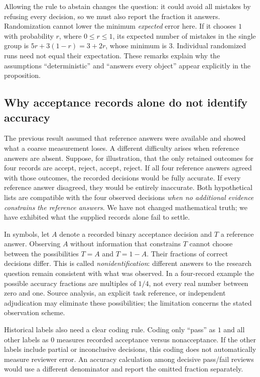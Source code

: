 Allowing the rule to abstain changes the question: it could avoid all mistakes
by refusing every decision, so we must also report the fraction it answers.
Randomization cannot lower the minimum \emph{expected} error here. If it
chooses $1$ with probability $r$, where $0\le r\le1$, its expected number of
mistakes in the single group is $5r+3(1-r)=3+2r$, whose minimum is $3$.
Individual randomized runs need not equal their expectation. These remarks
explain why the assumptions ``deterministic'' and ``answers every object''
appear explicitly in the proposition.

\subsection{Why acceptance records alone do not identify accuracy}
\label{subsec:accuracy}

The previous result assumed that reference answers were available and showed
what a coarse measurement loses. A different difficulty arises when reference
answers are absent. Suppose, for illustration, that the only retained outcomes
for four records are accept, reject, accept, reject. If all four reference
answers agreed with those outcomes, the recorded decisions would be fully
accurate. If every reference answer disagreed, they would be entirely
inaccurate. Both hypothetical lists are compatible with the four observed
decisions \emph{when no additional evidence constrains the reference answers}.
We have not changed mathematical truth; we have exhibited what the supplied
records alone fail to settle.

In symbols, let $A$ denote a recorded binary acceptance decision and $T$ a
reference answer. Observing $A$ without information that constrains $T$ cannot
choose between the possibilities $T=A$ and $T=1-A$. Their fractions of correct
decisions differ. This is called \emph{nonidentification}: different answers
to the research question remain consistent with what was observed. In a
four-record example the possible accuracy fractions are multiples of $1/4$,
not every real number between zero and one. Source analysis, an explicit
task reference, or independent adjudication may eliminate these possibilities;
the limitation concerns the stated observation scheme.

Historical labels also need a clear coding rule. Coding only ``pass'' as $1$
and all other labels as $0$ measures recorded acceptance versus nonacceptance.
If the other labels include partial or inconclusive decisions, this coding
does not automatically measure reviewer error. An accuracy calculation among
decisive pass/fail reviews would use a different denominator and report the
omitted fraction separately.

